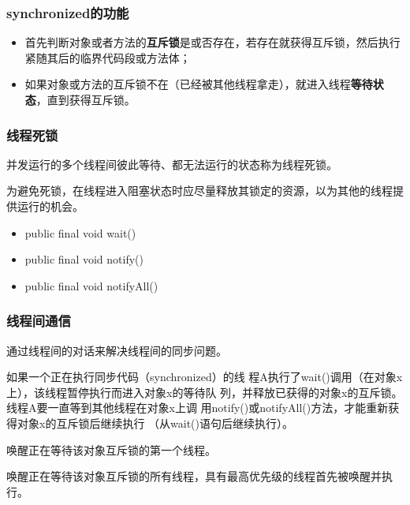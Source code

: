 \begin{frame}[fragile]
  \frametitle{synchronized的功能}

  \begin{itemize}\kai
  \item 首先判断对象或者方法的{\bf\Red 互斥锁}是或否存在，若存在就获得互斥锁，然后执行紧随其后的临界代码段或方法体；
  \item 如果对象或方法的互斥锁不在（已经被其他线程拿走），就进入线程{\bf\Blue 等待状态}，直到获得互斥锁。
  \end{itemize}

  
\end{frame}


\begin{frame}[fragile]
  \frametitle{线程死锁}

  并发运行的多个线程间彼此等待、都无法运行的状态称为{\hei\Blue 线程死锁}。

  {\kai\Red 为避免死锁，在线程进入阻塞状态时应尽量释放其锁定的资源，以为其他的线程提供运行的机会。}

  
  \begin{itemize}
  \item public final void wait()
  \item public final void notify()
  \item public final void notifyAll()
  \end{itemize}
\end{frame}

\begin{frame}[fragile]
  \frametitle{线程间通信}

  通过线程间的{\Red\hei 对话}来解决线程间的同步问题。

  \pause

   {\small\kai 如果一个正在执行同步代码（synchronized）的线
    程A执行了wait()调用（在对象x上），该线程暂停执行而进入对象x的等待队
    列，并释放已获得的对象x的互斥锁。线程A要一直等到其他线程在对象x上调
    用notify()或notifyAll()方法，才能重新获得对象x的互斥锁后继续执行
    （从wait()语句后继续执行）。}

  \pause{} {\small\kai 唤醒正在等待该对象互斥锁的第一个线程。}

  \pause{} {\small\kai 唤醒正在等待该对象互斥锁的所有线程，具有最高优先级的线程首先被唤醒并执行。}
  
\end{frame}

